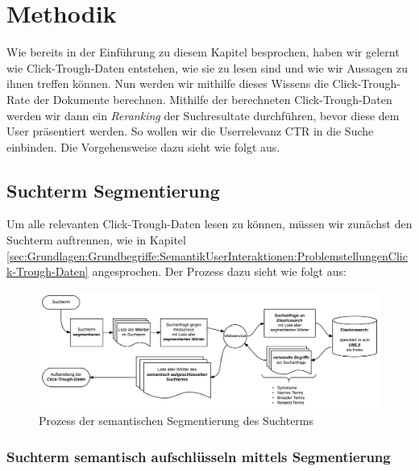 \section{Methodik}
\label{sec:Reranking:Methodik}

Wie bereits in der Einführung zu diesem Kapitel besprochen, haben wir gelernt wie Click-Trough-Daten entstehen, wie sie zu lesen sind und wie wir Aussagen zu ihnen treffen können. Nun werden wir mithilfe dieses Wissens die Click-Trough-Rate der Dokumente berechnen. Mithilfe der berechneten Click-Trough-Daten werden wir dann ein \textit{Reranking} der Suchresultate durchführen, bevor diese dem User präsentiert werden. So wollen wir die Userrelevanz CTR in die Suche einbinden. Die Vorgehensweise dazu sieht wie folgt aus.

\subsection{Suchterm Segmentierung}
\label{sec:Reranking:Methodik:SuchtermSegmentierung}

Um alle relevanten Click-Trough-Daten lesen zu können, müssen wir zunächst den Suchterm auftrennen, wie in Kapitel \ref{sec:Grundlagen:Grundbegriffe:SemantikUserInteraktionen:ProblemstellungenClick-Trough-Daten} angesprochen. Der Prozess dazu sieht wie folgt aus:

\begin{figure}[H]
\centering
\vspace{-1em}
\caption[Prozess der semantischen Segmentierung des Suchterms]{Prozess der semantischen Segmentierung des Suchterms}
\label{fig:SemantischeSegmentierung}
\includegraphics[width=\linewidth]{gfx/SuchtermSegmentierung}
\vspace{-2em}
\end{figure} 

\subsubsection{Suchterm semantisch aufschlüsseln mittels Segmentierung}
\label{sec:Reranking:Methodik:SuchtermSegmentierung:SuchtermSegmentierung}

